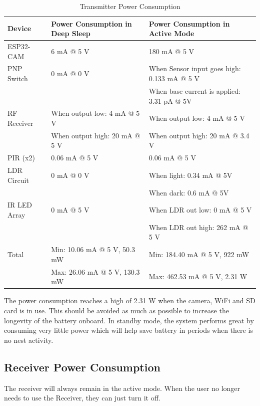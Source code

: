 \documentclass[class=report,11pt,crop=false]{standalone}
\begin{document}
\begin{table}[h]
\centering
\begin{tabular}{|p{2.5cm}|p{6.5cm}|p{6.5cm}|}
\hline
\textbf{Device} & \textbf{Power Consumption in Deep Sleep} & \textbf{Power Consumption in Active Mode} \\
\hline
ESP32-CAM & 6 mA @ 5 V & 180 mA @ 5 V \\
\hline
PNP Switch & 0 mA @ 0 V & When Sensor input goes high: 0.133 mA @ 5 V \\
& & When base current is applied: 3.31 pA @ 5V \\
\hline
RF Receiver & When output low: 4 mA @ 5 V & When output low: 4 mA @ 5 V \\
& When output high: 20 mA @ 5 V & When output high: 20 mA @ 3.4 V \\
\hline
PIR (x2) & 0.06 mA @ 5 V & 0.06 mA @ 5 V \\
\hline
LDR Circuit & 0 mA @ 0 V & When light: 0.34 mA @ 5V \\
& & When dark: 0.6 mA @ 5V \\
\hline
IR LED Array & 0 mA @ 5 V & When LDR out low: 0 mA @ 5 V \\
& & When LDR out high: 262 mA @ 5 V \\
\hline
Total & Min: 10.06 mA @ 5 V, 50.3 mW & Min: 184.40 mA @ 5 V, 922 mW \\
& Max: 26.06 mA @ 5 V, 130.3 mW & Max: 462.53 mA @ 5 V, 2.31 W \\
\hline
\end{tabular}
\caption{Transmitter Power Consumption}
\label{tab:CT_PWR}
\end{table}

The power consumption reaches a high of 2.31 W when the camera, WiFi and SD card is in use. This should be avoided as much as possible to increase the longevity of the battery onboard. In standby mode, the system performs great by consuming very little power which will help save battery in periods when there is no nest activity. 

\subsection{Receiver Power Consumption}
The receiver will always remain in the active mode. When the user no longer needs to use the Receiver, they can just turn it off. 
\end{document}
